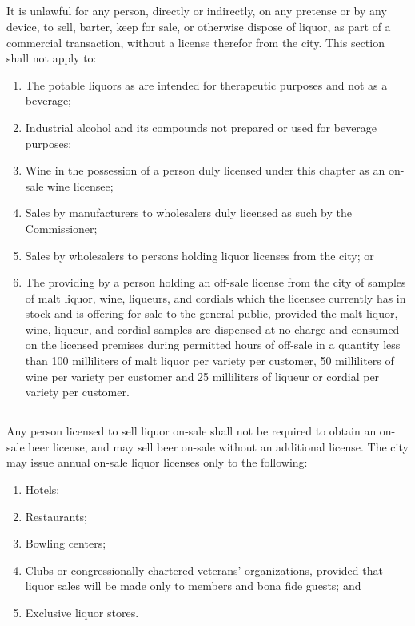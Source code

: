\subsection{}
It is unlawful for any person, directly or indirectly, on any pretense or by any device, to sell, barter, keep for sale, or otherwise dispose of liquor, as part of a commercial transaction, without a license therefor from the city. This section shall not apply to:
\begin{enumerate}[{\indent}1)]
    \item The potable liquors as are intended for therapeutic purposes and not as a beverage; 
    \item Industrial alcohol and its compounds not prepared or used for beverage purposes; 
    \item Wine in the possession of a person duly licensed under this chapter as an on-sale wine licensee;
    \item Sales by manufacturers to wholesalers duly licensed as such by the Commissioner; 
    \item Sales by wholesalers to persons holding liquor licenses from the city; or 
    \item The providing by a person holding an off-sale license from the city of samples of malt liquor, wine, liqueurs, and cordials which the licensee currently has in stock and is offering for sale to the general public, provided the malt liquor, wine, liqueur, and cordial samples are dispensed at no charge and consumed on the licensed premises during permitted hours of off-sale in a quantity less than 100 milliliters of malt liquor per variety per customer, 50 milliliters of wine per variety per customer and 25 milliliters of liqueur or cordial per variety per customer.
\end{enumerate}
\subsection{}
Any person licensed to sell liquor on-sale shall not be required to obtain an on-sale beer license, and may sell beer on-sale without an additional license.  The city may issue annual on-sale liquor licenses only to the following:
\begin{enumerate}[{\indent}1)]
    \item Hotels; 
    \item Restaurants; 
    \item Bowling centers; 
    \item Clubs or congressionally chartered veterans’ organizations, provided that liquor sales will be made only to members and bona fide guests; and 
    \item Exclusive liquor stores.
\end{enumerate}

